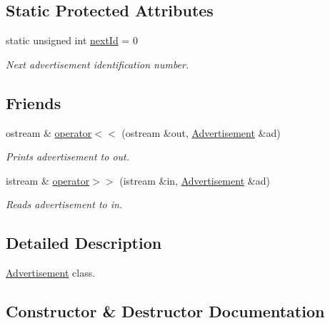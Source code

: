 \subsection*{Static Protected Attributes}
\begin{DoxyCompactItemize}
\item 
\hypertarget{class_advertisement_a0b5a0f2ec778aba63d0dd24bb3b2675b}{}static unsigned int \hyperlink{class_advertisement_a0b5a0f2ec778aba63d0dd24bb3b2675b}{next\+Id} = 0\label{class_advertisement_a0b5a0f2ec778aba63d0dd24bb3b2675b}

\begin{DoxyCompactList}\small\item\em Next advertisement identification number. \end{DoxyCompactList}\end{DoxyCompactItemize}
\subsection*{Friends}
\begin{DoxyCompactItemize}
\item 
ostream \& \hyperlink{class_advertisement_af6ba8e9ebe3c64e17263cbbcaa8bbb59}{operator$<$$<$} (ostream \&out, \hyperlink{class_advertisement}{Advertisement} \&ad)
\begin{DoxyCompactList}\small\item\em Prints advertisement to out. \end{DoxyCompactList}\item 
istream \& \hyperlink{class_advertisement_a5180e86255ebd01c83666f431b910bb4}{operator$>$$>$} (istream \&in, \hyperlink{class_advertisement}{Advertisement} \&ad)
\begin{DoxyCompactList}\small\item\em Reads advertisement to in. \end{DoxyCompactList}\end{DoxyCompactItemize}


\subsection{Detailed Description}
\hyperlink{class_advertisement}{Advertisement} class. 

\subsection{Constructor \& Destructor Documentation}
\hypertarget{class_advertisement_aa39584aae7c125c74a9dfe97409ae326}{}
